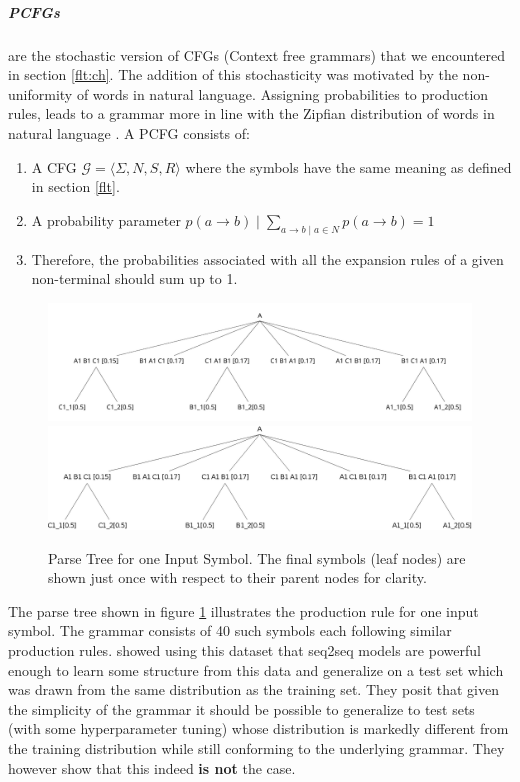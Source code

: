 \subparagraph{PCFGs} are the stochastic version of CFGs (Context free grammars) that we encountered in section \ref{flt:ch}. The addition of this stochasticity was motivated by the non-uniformity of words in natural language. Assigning probabilities to production rules, leads to a grammar more in line with the Zipfian distribution of words in natural language \citep{jurafsky2014speech}. A PCFG consists of:

\begin{enumerate}
	\item A CFG $\mathcal{G} = \langle \Sigma, N, S, R \rangle$ where the symbols have the same meaning as defined in section \ref{flt}.
	\item A probability parameter $p(a \rightarrow b) \mid \displaystyle \sum_{a \rightarrow b \mid a \in N} p(a \rightarrow b) = 1 $ 
	\item Therefore, the probabilities associated with all the expansion rules of a given non-terminal should sum up to 1.
\end{enumerate}

\begin{figure}
	\begin{minipage}[ht]{\textwidth}
		\ifpdf
		\includegraphics[width=\linewidth,keepaspectratio=true]{./figs/A-pdf}
		\else
		\includegraphics[width=\linewidth,keepaspectratio=true]{./figs/A-eps}
		\fi
		\caption{\small Parse Tree for one Input Symbol. The final symbols (leaf nodes) are shown just once with respect to their parent nodes for clarity.}
		\label{parse-tree}
	\end{minipage}
\end{figure}

The parse tree shown in figure \ref{parse-tree} illustrates the production rule for one input symbol. The grammar consists of 40 such symbols each following similar production rules. \cite{Weber2018} showed using this dataset that seq2seq models are powerful enough to learn some structure from this data and generalize on a test set which was drawn from the same distribution as the training set. They posit that given the simplicity of the grammar it should be possible to generalize to test sets (with some hyperparameter tuning) whose distribution is markedly different from the training distribution while still conforming to the underlying grammar. They however show that this indeed \textbf{is not} the case.

